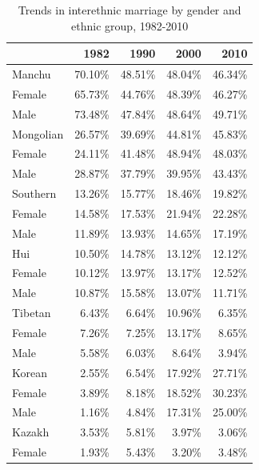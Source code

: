 \begin{table}
    \renewcommand{\arraystretch}{1.0}
    \begin{center}
        \caption{Trends in interethnic marriage by gender and ethnic group, 1982-2010}
        \label{tab:trends_ethngrp}
        \begin{tabular}{l rrrr}
            \hline\hline
                         & 1982    & 1990    & 2000    & 2010    \\
            \hline
            Manchu       & 70.10\% & 48.51\% & 48.04\% & 46.34\% \\
            \quad Female & 65.73\% & 44.76\% & 48.39\% & 46.27\% \\
            \quad Male   & 73.48\% & 47.84\% & 48.64\% & 49.71\% \\
            Mongolian    & 26.57\% & 39.69\% & 44.81\% & 45.83\% \\
            \quad Female & 24.11\% & 41.48\% & 48.94\% & 48.03\% \\
            \quad Male   & 28.87\% & 37.79\% & 39.95\% & 43.43\% \\
            Southern     & 13.26\% & 15.77\% & 18.46\% & 19.82\% \\
            \quad Female & 14.58\% & 17.53\% & 21.94\% & 22.28\% \\
            \quad Male   & 11.89\% & 13.93\% & 14.65\% & 17.19\% \\
            Hui          & 10.50\% & 14.78\% & 13.12\% & 12.12\% \\
            \quad Female & 10.12\% & 13.97\% & 13.17\% & 12.52\% \\
            \quad Male   & 10.87\% & 15.58\% & 13.07\% & 11.71\% \\
            Tibetan      & 6.43\%  & 6.64\%  & 10.96\% & 6.35\%  \\
            \quad Female & 7.26\%  & 7.25\%  & 13.17\% & 8.65\%  \\
            \quad Male   & 5.58\%  & 6.03\%  & 8.64\%  & 3.94\%  \\
            Korean       & 2.55\%  & 6.54\%  & 17.92\% & 27.71\% \\
            \quad Female & 3.89\%  & 8.18\%  & 18.52\% & 30.23\% \\
            \quad Male   & 1.16\%  & 4.84\%  & 17.31\% & 25.00\% \\
            Kazakh       & 3.53\%  & 5.81\%  & 3.97\%  & 3.06\%  \\
            \quad Female & 1.93\%  & 5.43\%  & 3.20\%  & 3.48\%  \\

\end{tabular}
\end{center}
\end{table}
